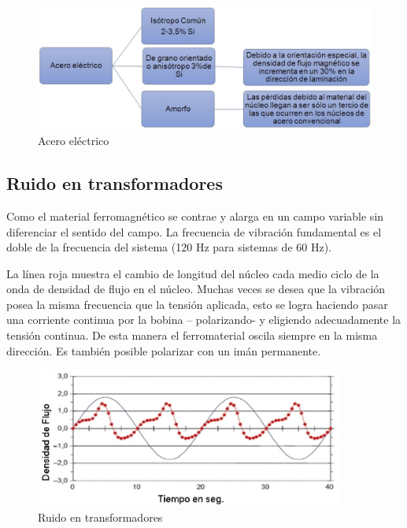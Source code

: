\begin{figure}[H]
    \centering
    \includegraphics[width=1.0\textwidth]{./Figures/aceroElectrico}
	\caption{Acero eléctrico}
	\label{fig:aceroElectrico}
\end{figure}

\subsection{Ruido en transformadores}

Como el material ferromagnético se contrae y alarga en un campo variable sin diferenciar el sentido del campo. La frecuencia de vibración fundamental es el doble de la frecuencia del sistema (120 Hz para sistemas de 60 Hz).

La línea roja muestra el cambio de longitud del núcleo cada medio ciclo de la onda de densidad de flujo en el núcleo. Muchas veces se desea que la vibración posea la misma frecuencia que la tensión aplicada, esto se logra haciendo pasar una corriente continua por la bobina – polarizando- y eligiendo adecuadamente la tensión continua. De esta manera el ferromaterial oscila siempre en la misma dirección. Es también posible polarizar con un imán permanente.


\begin{figure}[H]
    \centering
    \includegraphics[width=0.9\textwidth]{./Figures/ruidoTrafo}
	\caption{Ruido en transformadores}
	\label{fig:ruidoTrafo}
\end{figure}

